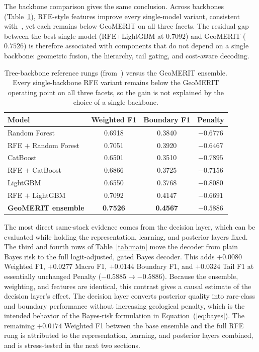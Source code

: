\documentclass[bdcc,article,submit,pdftex,moreauthors]{Definitions/mdpi}
\begin{document}
The backbone comparison gives the same conclusion. Across backbones
(Table~\ref{tab:backbones}), RFE-style features improve every single-model variant, consistent
with~\cite{chen2026rfe}, yet each remains below GeoMERIT on all three facets. The residual gap
between the best single model (RFE+LightGBM at $0.7092$) and GeoMERIT ($0.7526$) is therefore
associated with components that do not depend on a single backbone: geometric fusion, the
hierarchy, tail gating, and cost-aware decoding.

\begin{table}[H]
\caption{Tree-backbone reference rungs (from~\cite{chen2026rfe}) versus the GeoMERIT
ensemble. Every single-backbone RFE variant remains below the GeoMERIT operating point on all
three facets, so the gain is not explained by the choice of a single backbone.\label{tab:backbones}}
\begin{tabularx}{\textwidth}{Xccc}
\toprule
\textbf{Model} & \textbf{Weighted F1} & \textbf{Boundary F1} & \textbf{Penalty}\\
\midrule
Random Forest & 0.6918 & 0.3840 & $-0.6776$\\
RFE $+$ Random Forest & 0.7051 & 0.3920 & $-0.6467$\\
CatBoost & 0.6501 & 0.3510 & $-0.7895$\\
RFE $+$ CatBoost & 0.6866 & 0.3725 & $-0.7156$\\
LightGBM & 0.6550 & 0.3768 & $-0.8080$\\
RFE $+$ LightGBM & 0.7092 & 0.4147 & $-0.6691$\\
\textbf{GeoMERIT ensemble} & \textbf{0.7526} & \textbf{0.4567} & $\mathbf{-0.5886}$\\
\bottomrule
\end{tabularx}
\end{table}

The most direct same-stack evidence comes from the decision layer, which can be evaluated while
holding the representation, learning, and posterior layers fixed. The third and fourth rows of
Table~\ref{tab:main} move the decoder from plain Bayes risk to the full logit-adjusted, gated
Bayes decoder. This adds $+0.0080$ Weighted F1, $+0.0277$ Macro F1, $+0.0144$ Boundary F1, and
$+0.0324$ Tail F1 at essentially unchanged Penalty ($-0.5885\to-0.5886$). Because the ensemble,
weighting, and features are identical, this contrast gives a causal estimate of the decision
layer's effect. The decision layer converts posterior quality into rare-class and boundary
performance without increasing geological penalty, which is the intended behavior of the
Bayes-risk formulation in Equation~(\ref{eq:bayes}). The remaining $+0.0174$ Weighted F1
between the base ensemble and the full RFE rung is attributed to the representation, learning,
and posterior layers combined, and is stress-tested in the next two sections.
\end{document}
